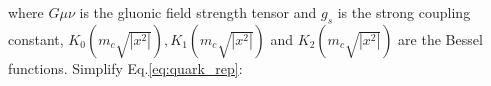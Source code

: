 where $G{\mu\nu}$ is the gluonic field strength tensor and $g_s$ is the strong coupling constant, $K_0\left(m_c \sqrt{|x^2|}\right), K_1\left(m_c \sqrt{|x^2|}\right)$ and $K_2\left(m_c \sqrt{|x^2|}\right)$ are the Bessel functions. Simplify Eq.\ref{eq:quark_rep}:
